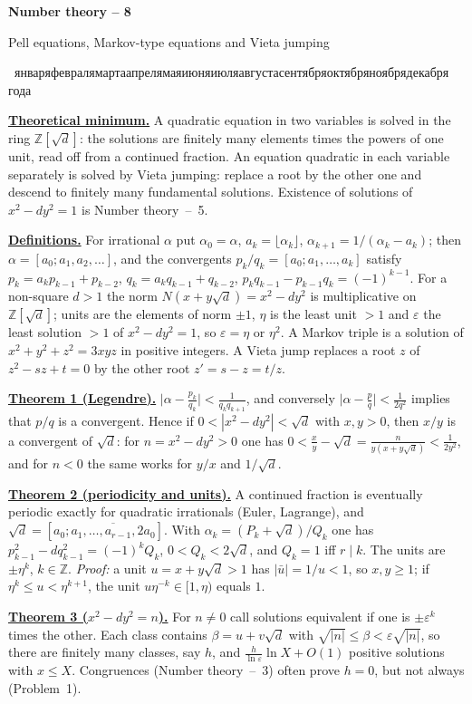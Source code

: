 \documentclass[11pt,a4paper]{article}
\newcommand{\head}[1]{\par\medskip\noindent\textbf{\underline{#1}}\quad}
\newcommand{\rudate}{\number\day~\ifcase\month\or января\or февраля\or марта\or апреля\or мая\or июня\or июля\or августа\or сентября\or октября\or ноября\or декабря\fi~\number\year~года}
\newcommand{\sheettitle}[3]{%
  \begin{center}
  {\huge\bfseries #1\par}\vspace{1.2em}
  {\Large #2\par}\vspace{0.8em}
  \if\relax\detokenize{#3}\relax\else{\Large #3\par}\vspace{0.8em}\fi
  {\foreignlanguage{russian}{\rudate}\par}
  \end{center}\vspace{0.5em}}
\begin{document}
\sheettitle{Number theory -- 8}{Pell equations, Markov-type equations and Vieta jumping}{}

\head{Theoretical minimum.} A quadratic equation in two variables is solved in the ring
$\mathbb Z[\sqrt d]$: the solutions are finitely many elements times the powers of one unit,
read off from a continued fraction. An equation quadratic in each variable separately is solved
by Vieta jumping: replace a root by the other one and descend to finitely many fundamental
solutions. Existence of solutions of $x^2-dy^2=1$ is Number theory~--~5.

\head{Definitions.} For irrational $\alpha$ put $\alpha_0=\alpha$, $a_k=\lfloor\alpha_k\rfloor$,
$\alpha_{k+1}=1/(\alpha_k-a_k)$; then $\alpha=[a_0;a_1,a_2,\dots]$, and the convergents
$p_k/q_k=[a_0;a_1,\dots,a_k]$ satisfy $p_k=a_kp_{k-1}+p_{k-2}$, $q_k=a_kq_{k-1}+q_{k-2}$,
$p_kq_{k-1}-p_{k-1}q_k=(-1)^{k-1}$. For a non-square $d>1$ the norm
$N(x+y\sqrt d)=x^2-dy^2$ is multiplicative on $\mathbb Z[\sqrt d]$; units are the elements of
norm $\pm1$, $\eta$ is the least unit $>1$ and $\varepsilon$ the least solution $>1$ of
$x^2-dy^2=1$, so $\varepsilon=\eta$ or $\eta^2$. A Markov triple is a solution of
$x^2+y^2+z^2=3xyz$ in positive integers. A Vieta jump replaces a root $z$ of $z^2-sz+t=0$ by
the other root $z'=s-z=t/z$.

\head{Theorem 1 (Legendre).} $\bigl|\alpha-\frac{p_k}{q_k}\bigr|<\frac1{q_kq_{k+1}}$, and
conversely $\bigl|\alpha-\frac pq\bigr|<\frac1{2q^2}$ implies that $p/q$ is a convergent. Hence
if $0<|x^2-dy^2|<\sqrt d$ with $x,y>0$, then $x/y$ is a convergent of $\sqrt d$: for
$n=x^2-dy^2>0$ one has $0<\frac xy-\sqrt d=\frac{n}{y(x+y\sqrt d)}<\frac1{2y^2}$, and for $n<0$
the same works for $y/x$ and $1/\sqrt d$.

\head{Theorem 2 (periodicity and units).} A continued fraction is eventually periodic exactly
for quadratic irrationals (Euler, Lagrange), and $\sqrt d=[a_0;\overline{a_1,\dots,a_{r-1},2a_0}]$.
With $\alpha_k=(P_k+\sqrt d)/Q_k$ one has $p_{k-1}^2-dq_{k-1}^2=(-1)^kQ_k$, $0<Q_k<2\sqrt d$,
and $Q_k=1$ iff $r\mid k$. The units are $\pm\eta^k$, $k\in\mathbb Z$. \emph{Proof:} a unit
$u=x+y\sqrt d>1$ has $|\bar u|=1/u<1$, so $x,y\geqslant1$; if $\eta^k\leqslant u<\eta^{k+1}$,
the unit $u\eta^{-k}\in[1,\eta)$ equals $1$.

\head{Theorem 3 ($x^2-dy^2=n$).} For $n\neq0$ call solutions equivalent if one is
$\pm\varepsilon^k$ times the other. Each class contains $\beta=u+v\sqrt d$ with
$\sqrt{|n|}\leqslant\beta<\varepsilon\sqrt{|n|}$, so there are finitely many classes, say $h$,
and $\frac h{\ln\varepsilon}\ln X+O(1)$ positive solutions with $x\leqslant X$. Congruences
(Number theory~--~3) often prove $h=0$, but not always (Problem~1).
\end{document}
